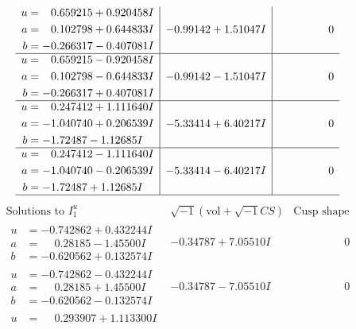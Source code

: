 \documentclass[1p]{elsarticle_modified}
\theoremstyle{definition}
\newcommand{\I}{\sqrt{-1}}
\begin{document}
$$\begin{array}{c|c|c}
\begin{aligned}
u &= \phantom{-}0.659215 + 0.920458 I \\
a &= \phantom{-}0.102798 + 0.644833 I \\
b &= -0.266317 - 0.407081 I\end{aligned}
 & -0.99142 + 1.51047 I & \phantom{-0.000000 } 0 \\ \hline\begin{aligned}
u &= \phantom{-}0.659215 - 0.920458 I \\
a &= \phantom{-}0.102798 - 0.644833 I \\
b &= -0.266317 + 0.407081 I\end{aligned}
 & -0.99142 - 1.51047 I & \phantom{-0.000000 } 0 \\ \hline\begin{aligned}
u &= \phantom{-}0.247412 + 1.111640 I \\
a &= -1.040740 + 0.206539 I \\
b &= -1.72487 - 1.12685 I\end{aligned}
 & -5.33414 + 6.40217 I & \phantom{-0.000000 } 0 \\ \hline\begin{aligned}
u &= \phantom{-}0.247412 - 1.111640 I \\
a &= -1.040740 - 0.206539 I \\
b &= -1.72487 + 1.12685 I\end{aligned}
 & -5.33414 - 6.40217 I & \phantom{-0.000000 } 0\\
 \hline 
 \end{array}$$\newpage$$\begin{array}{c|c|c}  
\text{Solutions to }I^u_{1}& \I (\text{vol} + \sqrt{-1}CS) & \text{Cusp shape}\\
 \hline 
\begin{aligned}
u &= -0.742862 + 0.432244 I \\
a &= \phantom{-}0.28185 - 1.45500 I \\
b &= -0.620562 + 0.132574 I\end{aligned}
 & -0.34787 + 7.05510 I & \phantom{-0.000000 } 0 \\ \hline\begin{aligned}
u &= -0.742862 - 0.432244 I \\
a &= \phantom{-}0.28185 + 1.45500 I \\
b &= -0.620562 - 0.132574 I\end{aligned}
 & -0.34787 - 7.05510 I & \phantom{-0.000000 } 0 \\ \hline\begin{aligned}
u &= \phantom{-}0.293907 + 1.113300 I \\

\end{aligned}
\end{array}$$
\end{document}
